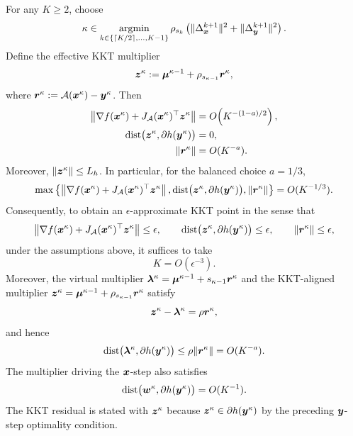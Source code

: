 \begin{theorem}
For any $K\ge2$, choose
\[
    \kappa
    \in
    \operatorname*{\mathrm{argmin}}_{k\in\{\lceil K/2\rceil,\ldots,K-1\}}
    \rho_{s_k}\left(\|\Delta_{\bm{x}}^{k+1}\|^2+\|\Delta_{\bm{y}}^{k+1}\|^2\right).
\]
Define the effective KKT multiplier
\[
    \bm{z}^\kappa
    :=
    \bm{\mu}^{\kappa-1}+\rho_{s_{\kappa-1}}\bm{r}^\kappa,
\]
where $\bm{r}^\kappa:=\mathcal{A}(\bm{x}^\kappa)-\bm{y}^\kappa$.
Then
\begin{equation}\label{eq:kkt-residual-general-a}
\begin{aligned}
    \left\|
        \nabla f(\bm{x}^\kappa)
        +J_{\mathcal{A}}(\bm{x}^\kappa)^\top \bm{z}^\kappa
    \right\|
    &=O\!\left(K^{-(1-a)/2}\right),\\
    \operatorname{dist}\bigl(\bm{z}^\kappa,\partial h(\bm{y}^\kappa)\bigr)
    &=0,\\
    \|\bm{r}^\kappa\|
    &=O(K^{-a}).
\end{aligned}
\end{equation}
Moreover, $\|\bm{z}^\kappa\|\le L_h$.  In particular, for the balanced
choice $a=1/3$,
\[
    \max\left\{
        \left\|
            \nabla f(\bm{x}^\kappa)
            +J_{\mathcal{A}}(\bm{x}^\kappa)^\top \bm{z}^\kappa
        \right\|,
        \operatorname{dist}\bigl(
            \bm{z}^\kappa,\partial h(\bm{y}^\kappa)
        \bigr),
        \|\bm{r}^\kappa\|
    \right\}
    =O(K^{-1/3}).
\]
Consequently, to obtain an $\epsilon$-approximate KKT point in the sense that
\[
    \left\|
    \nabla f(\bm{x}^\kappa)
    +
    J_{\mathcal{A}}(\bm{x}^\kappa)^\top \bm{z}^\kappa
    \right\|
    \le
    \epsilon,
    \qquad
    \operatorname{dist}\bigl(
        \bm{z}^\kappa,\partial h(\bm{y}^\kappa)
    \bigr)
    \le
    \epsilon,
    \qquad
    \|\bm{r}^\kappa\|
    \le
    \epsilon,
\]
under the assumptions above, it suffices to take
\[
    K
    =
    O(\epsilon^{-3}).
\]
Moreover, the virtual multiplier
$\bm{\lambda}^\kappa=\bm{\mu}^{\kappa-1}+s_{\kappa-1}\bm{r}^\kappa$
and the KKT-aligned multiplier
$\bm{z}^\kappa=\bm{\mu}^{\kappa-1}+\rho_{s_{\kappa-1}}\bm{r}^\kappa$
satisfy
\[
    \bm{z}^\kappa-\bm{\lambda}^\kappa
    =
    \rho\bm{r}^\kappa,
\]
and hence
\[
    \operatorname{dist}\bigl(
        \bm{\lambda}^\kappa,\partial h(\bm{y}^\kappa)
    \bigr)
    \le \rho\|\bm{r}^\kappa\|
    =O(K^{-a}).
\]
The multiplier driving the $\bm{x}$-step also satisfies
\[
    \operatorname{dist}\bigl(
        \bm{w}^\kappa,\partial h(\bm{y}^\kappa)
    \bigr)
    =O(K^{-1}).
\]
The KKT residual is stated with $\bm{z}^\kappa$ because
$\bm{z}^\kappa\in\partial h(\bm{y}^\kappa)$ by the preceding $\bm{y}$-step
optimality condition.
\end{theorem}

